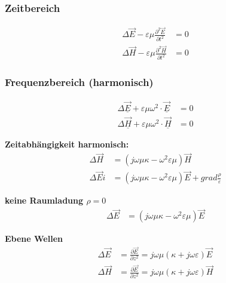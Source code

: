 \subsubsection{Zeitbereich}
\begin{align*}
    \Delta \vec{E}-\varepsilon \mu \frac{\partial^{2} \vec{E}}{\partial t^{2}} & =0 \\
    \Delta \vec{H}-\varepsilon \mu \frac{\partial^{2} \vec{H}}{\partial t^{2}} & =0
\end{align*}

\subsubsection{Frequenzbereich (harmonisch)}
\begin{align*}
    \Delta \underline{\vec{E}}+\varepsilon \mu \omega^{2} \cdot \underline{\vec{E}} & =0 \\
    \Delta \underline{\vec{H}}+\varepsilon \mu \omega^{2} \cdot \underline{\vec{H}} & =0
\end{align*}

\textbf{Zeitabhängigkeit harmonisch:}
\begin{align*}
    \Delta \vec{H}   & = (j \omega \mu \kappa - \omega^2 \varepsilon \mu ) \vec{H}                                  \\
    \Delta \vec{E} i & = (j \omega \mu \kappa - \omega^2 \varepsilon \mu ) \vec{E} + grad \frac{ \rho}{\varepsilon}
\end{align*}

\textbf{keine Raumladung $ \rho = 0$}
\begin{align*}
    \Delta \vec{E} & = (j \omega \mu \kappa - \omega^2 \varepsilon \mu ) \vec{E}
\end{align*}

\textbf{Ebene Wellen}
\begin{align*}
    \Delta \vec{E} & = \frac{ \partial \vec{E}}{ \partial z^2} = j \omega \mu ( \kappa + j \omega \varepsilon) \vec{E} \\
    \Delta \vec{H} & = \frac{ \partial \vec{E}}{ \partial z^2} = j \omega \mu ( \kappa + j \omega \varepsilon) \vec{H}
\end{align*}


